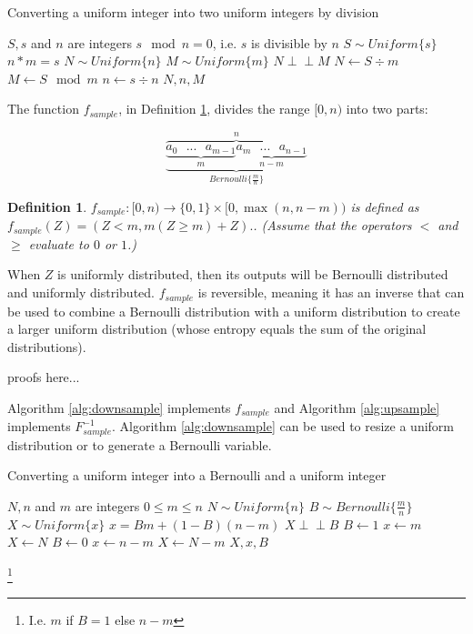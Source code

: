 \documentclass[12pt]{article}
\newtheorem{definition}{Definition}
\newcommand{\indep}{\perp\!\!\!\perp}
\begin{document}
\begin{algorithm}
\caption{Converting a uniform integer into two uniform integers by division}
\label{alg:divide-uniform}
\begin{algorithmic}[1]
    \Require $S, s$ and $n$ are integers
    \Require $s \mod n = 0$, i.e. $s$ is divisible by $n$
    \Require $S \sim Uniform\{s\}$
    \Ensure $n * m = s$
    \Ensure $N \sim Uniform\{n\}$
    \Ensure $M \sim Uniform\{m\}$
    \Ensure $N \indep M$
  \State $N \gets S \div m$
  \State $M \gets S \mod m$
  \State $n \gets s \div n$
  \State \Return $N, n, M$
\EndProcedure
\end{algorithmic}
\end{algorithm}


The function $f_{sample}$, in Definition \ref{def:sample}, divides the range $[0,n)$ into two parts:

\[
\overbrace{
    \underbrace{
        \underbrace{a_0 \text{   } ... \text{   } a_{m-1}}_{m}
        \underbrace{a_m \text{   } ... \text{   } a_{n-1}}_{n-m}}
    }_{Bernoulli\{\frac{m}{n}\}}^{n}
\]

\begin{definition}
$f_{sample}: [0,n) \rightarrow \{0,1\} \times [0,\max(n,n-m))$ is defined as $f_{sample}(Z) = (Z<m, m(Z\ge m) + Z).$. (Assume that the operators $<$ and $\ge$ evaluate to $0$ or $1$.)
\label{def:sample}
\end{definition}

When $Z$ is uniformly distributed, then its outputs will be Bernoulli distributed and uniformly distributed. $f_{sample}$ is reversible, meaning it has an inverse that can be used to combine a Bernoulli distribution with a uniform distribution to create a larger uniform distribution (whose entropy equals the sum of the original distributions).

proofs here...

Algorithm \ref{alg:downsample} implements $f_{sample}$ and Algorithm \ref{alg:upsample} implements $F^{-1}_{sample}$. Algorithm \ref{alg:downsample} can be used to resize a uniform distribution or to generate a Bernoulli variable.


\begin{algorithm}
\caption{Converting a uniform integer into a Bernoulli and a uniform integer}
\label{alg:downsample}
\begin{algorithmic}[1]
    \Require $N, n$ and $m$ are integers 
    \Require $0 \le m \le n$
    \Require $N \sim Uniform \{n\}$
    \Ensure $B \sim Bernoulli\{\frac{m}{n}\}$
    \Ensure $X \sim Uniform\{x\}$
    \Ensure $x = Bm + (1-B)(n-m)$\footnotemark
    \Ensure $X \indep B$
    \State $B \gets 1$  
    \State $x \gets m$
    \State $X \gets N$
  \Else
    \State $B \gets 0$  
    \State $x \gets n-m$
    \State $X \gets N-m$
  \EndIf
  \State \Return $X, x, B$
\EndProcedure
\end{algorithmic}
\end{algorithm}
\footnote{I.e. $m$ if $B=1$ else $n-m$}
\end{document}
